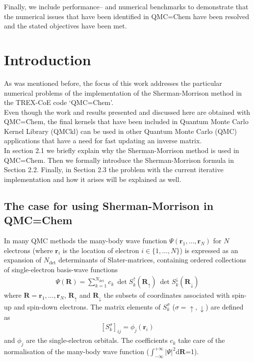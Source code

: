 \documentclass[11pt]{article}
\numberwithin{figure}{section}
\numberwithin{table}{section}
\begin{document}
      Finally, we include performance-- and numerical benchmarks to demonstrate that the numerical issues that have been identified in QMC=Chem have been resolved and the stated objectives have been met.

  \section{Introduction}
	
      As was mentioned before, the focus of this work addresses the particular numerical problems of the implementation of the Sherman-Morrison method in the TREX-CoE code `QMC=Chem'.\\
      
      Even though the work and results presented and discussed here are obtained with QMC=Chem, the final kernels that have been included in Quantum Monte Carlo Kernel Library (QMCkl) can be used in other Quantum Monte Carlo (QMC) applications that have a need for fast updating an inverse matrix.\\
      
        In section 2.1 we briefly explain why the Sherman-Morrison method is used in QMC=Chem. Then we formally introduce the Sherman-Morrison formula in Section 2.2. Finally, in Section 2.3 the problem with the current iterative implementation and how it arises will be explained as well.
	
		\subsection{The case for using Sherman-Morrison in QMC=Chem}
			In many QMC methods the many-body wave function $\Psi(\mathbf{r}_1,\ldots,\mathbf{r}_N)$ for $N$ electrons (where $\mathbf{r}_i$ is the location of electron $i\in\{1,\ldots ,N\}$) is expressed as an expansion of $N_\mathrm{det}$ determinants of Slater-matrices, containing ordered collections of single-electron basis-wave functions
			\begin{align}\label{eqn:mbwf}
				\Psi(\mathbf{R}) = \sum_{k=1}^{N_\mathrm{det}}c_k\:\det S_k^\uparrow(\mathbf{R}_\uparrow)\:\det S_k^\downarrow(\mathbf{R}_\downarrow)
			\end{align}
			where $\mathbf{R}=\mathbf{r}_1,\ldots,\mathbf{r}_N$, $\mathbf{R}_\uparrow$ and $\mathbf{R}_\downarrow$ the subsets of coordinates associated with spin-up and spin-down electrons. The matrix elements of $S_k^\sigma$ ($\sigma=\uparrow,\downarrow$) are defined as 
			\begin{align}
				\left[S_k^\sigma\right]_{ij} = \phi_j(\mathbf{r}_i)
			\end{align}
			and $\phi_j$ are the single-electron orbitals. The coefficients $c_k$ take care of the normalisation of the many-body wave function ($\int_{-\infty}^{+\infty}|\Psi|^2\mathrm{d}\mathbf{R}$=1).\\
			
\end{document}
